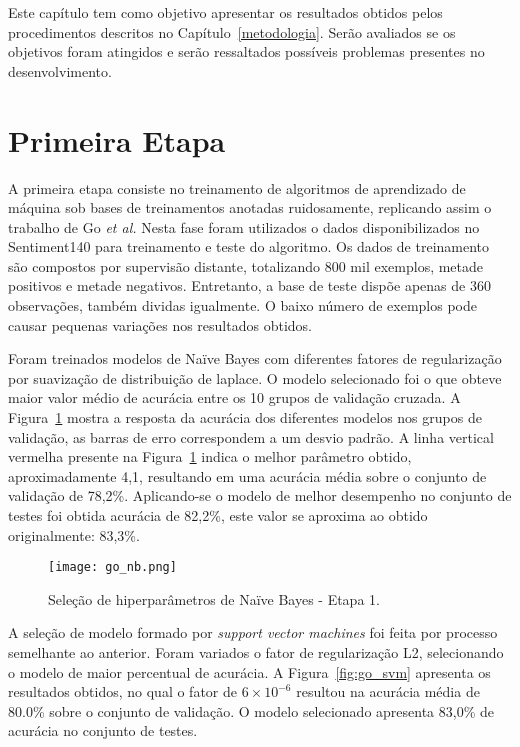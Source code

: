 Este capítulo tem como objetivo apresentar os resultados obtidos pelos procedimentos descritos no
Capítulo~\ref{metodologia}.
Serão avaliados se os objetivos foram atingidos e serão ressaltados possíveis problemas presentes no desenvolvimento.

\section{Primeira Etapa}

A primeira etapa consiste no treinamento de algoritmos de aprendizado de máquina sob bases de treinamentos anotadas
ruidosamente, replicando assim o trabalho de Go \textit{et al.}
Nesta fase foram utilizados o dados disponibilizados no Sentiment140 para treinamento e teste do algoritmo.
Os dados de treinamento são compostos por supervisão distante, totalizando 800 mil exemplos, metade positivos e metade
negativos.
Entretanto, a base de teste dispõe apenas de 360 observações, também dividas igualmente.
O baixo número de exemplos pode causar pequenas variações nos resultados obtidos.

Foram treinados modelos de Naïve Bayes com diferentes fatores de regularização por suavização de distribuição de
laplace.
O modelo selecionado foi o que obteve maior valor médio de acurácia entre os 10 grupos de validação cruzada.
A Figura~\ref{fig:go_nb} mostra a resposta da acurácia dos diferentes modelos nos grupos de validação, as barras de erro
correspondem a um desvio padrão.
A linha vertical vermelha presente na Figura~\ref{fig:go_nb} indica o melhor parâmetro obtido, aproximadamente 4,1,
resultando em uma acurácia média sobre o conjunto de validação de 78,2\%.
Aplicando-se o modelo de melhor desempenho no conjunto de testes foi obtida acurácia de 82,2\%, este valor se aproxima
ao obtido originalmente: 83,3\%.

\begin{figure}
\begin{center} {
    \begin{center}
    \texttt{[image: go\_nb.png]}
    \caption{Seleção de hiperparâmetros de Naïve Bayes - Etapa 1.}
    \label{fig:go_nb}
    \end{center}
}
\end{center}
\end{figure}

A seleção de modelo formado por \textit{support vector machines} foi feita por processo semelhante ao anterior.
Foram variados o fator de regularização L2, selecionando o modelo de maior percentual de acurácia.
A Figura~\ref{fig:go_svm} apresenta os resultados obtidos, no qual o fator de $6 \times 10^{-6}$ resultou na acurácia
média de 80.0\% sobre o conjunto de validação.
O modelo selecionado apresenta 83,0\% de acurácia no conjunto de testes.

